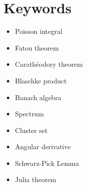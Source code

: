 %
%
%
%
%

\chapter{Keywords}

\begin{itemize}
    \item Poisson integral
    \item Fatou theorem
    \item Carathéodory theorem
    \item Blaschke product
    \item Banach algebra
    \item Spectrum
    \item Cluster set
    \item Angular derivative
    \item Schwarz-Pick Lemma
    \item Julia theorem
\end{itemize}

\endinput

